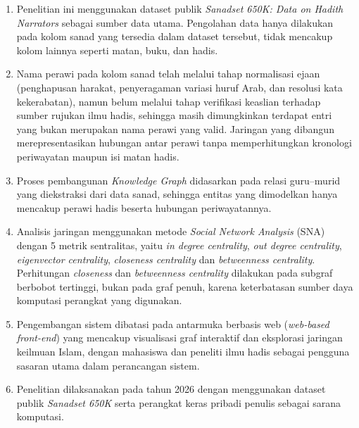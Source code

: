 \begin{enumerate}
	\item Penelitian ini menggunakan dataset publik \textit{Sanadset 650K: Data on Hadith Narrators} sebagai sumber data utama. Pengolahan data hanya dilakukan pada kolom sanad yang tersedia dalam dataset tersebut, tidak mencakup kolom lainnya seperti matan, buku, dan hadis.

	\item Nama perawi pada kolom sanad telah melalui tahap normalisasi ejaan (penghapusan harakat, penyeragaman variasi huruf Arab, dan resolusi kata kekerabatan), namun belum melalui tahap verifikasi keaslian terhadap sumber rujukan ilmu hadis, sehingga masih dimungkinkan terdapat entri yang bukan merupakan nama perawi yang valid. Jaringan yang dibangun merepresentasikan hubungan antar perawi tanpa memperhitungkan kronologi periwayatan maupun isi matan hadis.

	\item Proses pembangunan \textit{Knowledge Graph} didasarkan pada relasi guru--murid yang diekstraksi dari data sanad, sehingga entitas yang dimodelkan hanya mencakup perawi hadis beserta hubungan periwayatannya.

	\item Analisis jaringan menggunakan metode \textit{Social Network Analysis} (SNA) dengan 5 metrik sentralitas, yaitu \textit{in degree centrality}, \textit{out degree centrality}, \textit{eigenvector centrality}, \textit{closeness centrality} dan \textit{betweenness centrality}. Perhitungan \textit{closeness} dan \textit{betweenness centrality} dilakukan pada subgraf berbobot tertinggi, bukan pada graf penuh, karena keterbatasan sumber daya komputasi perangkat yang digunakan.

	\item Pengembangan sistem dibatasi pada antarmuka berbasis web (\textit{web-based front-end}) yang mencakup visualisasi graf interaktif dan eksplorasi jaringan keilmuan Islam, dengan mahasiswa dan peneliti ilmu hadis sebagai pengguna sasaran utama dalam perancangan sistem.

	\item Penelitian dilaksanakan pada tahun 2026 dengan menggunakan dataset publik \textit{Sanadset 650K} serta perangkat keras pribadi penulis sebagai sarana komputasi.
\end{enumerate}


